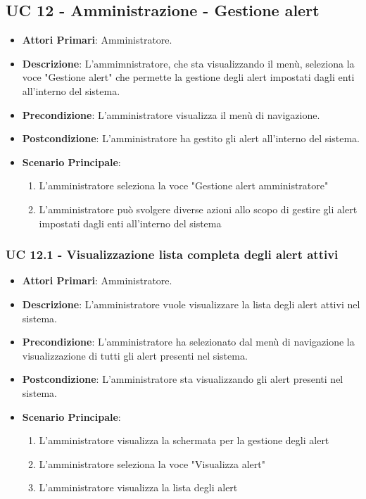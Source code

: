 	\subsection{UC 12 - Amministrazione - Gestione alert}

		\begin{itemize}
			\item \textbf{Attori Primari}: Amministratore.
			\item \textbf{Descrizione}: L'ammimnistratore, che sta visualizzando il menù, seleziona la voce "Gestione alert" che permette la gestione degli alert impostati dagli enti all'interno del sistema.
			\item \textbf{Precondizione}: L'amministratore visualizza il menù di navigazione.
			\item \textbf{Postcondizione}: L'amministratore ha gestito gli alert all'interno del sistema.
			\item \textbf{Scenario Principale}:
			\begin{enumerate}
				\item{L'amministratore seleziona la voce "Gestione alert amministratore"}
				\item{L'amministratore può svolgere diverse azioni allo scopo di gestire gli alert impostati dagli enti all'interno del sistema}
			\end{enumerate}	
		\end{itemize}

		\subsubsection{UC 12.1 - Visualizzazione lista completa degli alert attivi}
		\begin{itemize}
			\item \textbf{Attori Primari}: Amministratore.
			\item \textbf{Descrizione}: L'amministratore vuole visualizzare la lista degli alert attivi nel sistema.
			\item \textbf{Precondizione}: L'amministratore ha selezionato dal menù di navigazione la visualizzazione di tutti gli alert presenti nel sistema.
			\item \textbf{Postcondizione}: L'amministratore sta visualizzando gli alert presenti nel sistema.
			\item \textbf{Scenario Principale}:
			\begin{enumerate}
				\item{L'amministratore visualizza la schermata per la gestione degli alert}
				\item{L'amministratore seleziona la voce "Visualizza alert"}
				\item{L'amministratore visualizza la lista degli alert}
			\end{enumerate}	
		\end{itemize}

